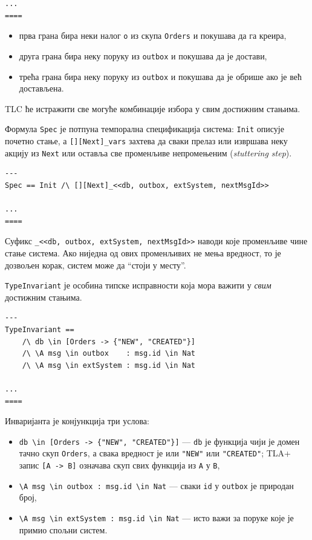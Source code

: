 \begin{primer}
\begin{lstlisting}
...
====
\end{lstlisting}
\begin{itemize}
    \item прва грана бира неки налог \texttt{o} из скупа \texttt{Orders} и покушава да га креира,
    \item друга грана бира неку поруку из \texttt{outbox} и покушава да је достави,
    \item трећа грана бира неку поруку из \texttt{outbox} и покушава да је обрише ако је већ достављена.
\end{itemize}
TLC ће истражити све могуће комбинације избора у свим достижним стањима.

Формула \texttt{Spec} је потпуна темпорална спецификација система: \texttt{Init} описује почетно стање,
а \texttt{[][Next]\_vars} захтева да сваки прелаз или извршава неку акцију из \texttt{Next} или оставља
све променљиве непромењеним (\textit{stuttering step}).
\begin{lstlisting}
---
Spec == Init /\ [][Next]_<<db, outbox, extSystem, nextMsgId>>

...
====
\end{lstlisting}
Суфикс \texttt{\_<<db, outbox, extSystem, nextMsgId>>} наводи које променљиве чине стање система.
Ако ниједна од ових променљивих не мења вредност, то је дозвољен корак, систем може да \enquote{стоји у месту}.

\texttt{TypeInvariant} је особина типске исправности која мора важити у \emph{свим} достижним стањима.
\begin{lstlisting}
---
TypeInvariant ==
    /\ db \in [Orders -> {"NEW", "CREATED"}]
    /\ \A msg \in outbox    : msg.id \in Nat
    /\ \A msg \in extSystem : msg.id \in Nat

...
====
\end{lstlisting}
Инваријанта је конјункција три услова:
\begin{itemize}
    \item \texttt{db \textbackslash in [Orders -> \{"NEW", "CREATED"\}]} --- \texttt{db} је функција чији је домен тачно скуп \texttt{Orders}, а свака вредност је или \texttt{"NEW"} или \texttt{"CREATED"}; TLA+ запис \texttt{[A -> B]} означава скуп свих функција из \texttt{A} у \texttt{B},
    \item \texttt{\textbackslash A msg \textbackslash in outbox : msg.id \textbackslash in Nat} --- сваки \texttt{id} у \texttt{outbox} је природан број,
    \item \texttt{\textbackslash A msg \textbackslash in extSystem : msg.id \textbackslash in Nat} --- исто важи за поруке које је примио спољни систем.
\end{itemize}


\end{primer}
